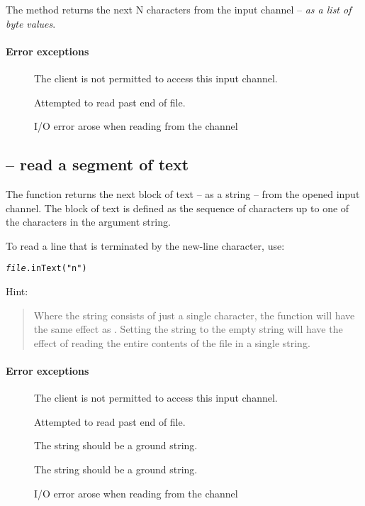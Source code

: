 
The  method returns the next N characters from the input channel -- \emph{as a list of  byte values}.

\paragraph{Error exceptions}
\begin{description}
\item[]
The client is not permitted to access this input channel.
\item[]
Attempted to read past end of file.
\item[]
I/O error arose when reading from the channel
\end{description}


\subsection{ -- read a segment of text}
\label{io:inText}


The  function returns the next block of text -- as a string -- from the opened input channel. The block of text is defined as the sequence of characters up to one of the characters in the argument string. 

To read a line that is terminated by the new-line character, use:
\begin{alltt}
\emph{file}.inText("\bsl{}n")
\end{alltt}

Hint:
\begin{quote}
Where the  string consists of just a single character, the  function will have the same effect as . 
Setting the  string to the empty string will have the effect of reading the entire contents of the file in a single string.
\end{quote}

\paragraph{Error exceptions}
\begin{description}
\item[]
The client is not permitted to access this input channel.
\item[]
Attempted to read past end of file.
\item[]
The  string should be a ground string.
\item[]
The  string should be a ground string.
\item[]
I/O error arose when reading from the channel
\end{description}



